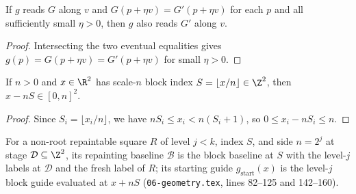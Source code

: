 \begin{lemma}
    \label{thm:peps_protocol_reading_congruence}
    \leanok
    If $g$ reads $G$ along $v$ and $G(p+\eta v)=G'(p+\eta v)$ for each $p$ and all sufficiently small $\eta>0$, then $g$ also reads $G'$ along $v$.
\end{lemma}

\begin{proof}\leanok
    Intersecting the two eventual equalities gives $g(p)=G(p+\eta v)=G'(p+\eta v)$ for small $\eta>0$.
\end{proof}

\begin{lemma}
    \label{thm:peps_protocol_block_coordinates}
    \leanok
    If $n>0$ and $x\in\R^2$ has scale-$n$ block index $S=\lfloor x/n\rfloor\in\Z^2$, then $x-nS\in[0,n]^2$.
\end{lemma}

\begin{proof}\leanok
    Since $S_i=\lfloor x_i/n\rfloor$, we have $nS_i\le x_i<n(S_i+1)$, so $0\le x_i-nS_i\le n$.
\end{proof}

\begin{definition}
    \label{def:peps_protocol_repaint_baseline}
    \leanok
    For a non-root repaintable square $R$ of level $j<k$, index $S$, and side $n=2^j$ at stage $\mathcal D\subseteq\Z^2$, its repainting baseline $\mathcal B$ is the block baseline at $S$ with the level-$j$ labels at $\mathcal D$ and the fresh label of $R$; its starting guide $g_{\mathrm{start}}(x)$ is the level-$j$ block guide evaluated at $x+nS$ (\texttt{06-geometry.tex}, lines 82--125 and 142--160).
\end{definition}

